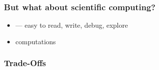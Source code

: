 \begin{frame}[fragile]
    \frametitle{But what about scientific computing?}
    

    \begin{itemize}
        \item \underline{} --- easy to read, write, debug, explore
            \vspace{0.4em}
            \vspace{0.4em}
            \vspace{0.4em}
        \item \underline{} computations
    \end{itemize}

\end{frame}




\begin{frame}
    \frametitle{Trade-Offs}

    \begin{figure}
       \begin{center}
       \end{center}
    \end{figure}

\end{frame}


